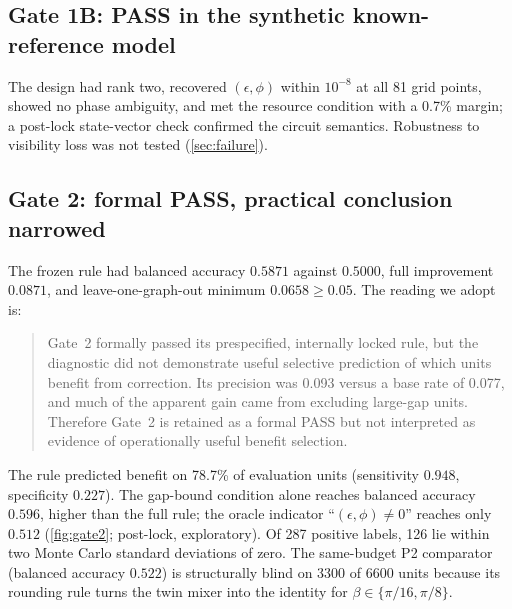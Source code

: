 \documentclass[10pt,twocolumn]{article}
\theoremstyle{definition}
\theoremstyle{remark}
\newcommand{\eps}{\epsilon}
\begin{document}
\subsection{Gate 1B: PASS in the synthetic known-reference model}
The design had rank two, recovered $(\eps,\phi)$ within $10^{-8}$ at all 81 grid points, showed no phase ambiguity, and met the resource condition with a 0.7\% margin; a post-lock state-vector check confirmed the circuit semantics. Robustness to visibility loss was not tested (\cref{sec:failure}).

\subsection{Gate 2: formal PASS, practical conclusion narrowed}
The frozen rule had balanced accuracy $0.5871$ against $0.5000$, full improvement $0.0871$, and leave-one-graph-out minimum $0.0658\ge0.05$. The reading we adopt is:
\begin{quote}\small
Gate~2 formally passed its prespecified, internally locked rule, but the diagnostic did not demonstrate useful selective prediction of which units benefit from correction. Its precision was 0.093 versus a base rate of 0.077, and much of the apparent gain came from excluding large-gap units. Therefore Gate~2 is retained as a formal PASS but not interpreted as evidence of operationally useful benefit selection.
\end{quote}
The rule predicted benefit on 78.7\% of evaluation units (sensitivity $0.948$, specificity $0.227$). The gap-bound condition alone reaches balanced accuracy $0.596$, higher than the full rule; the oracle indicator ``$(\eps,\phi)\neq0$'' reaches only $0.512$ (\cref{fig:gate2}; post-lock, exploratory). Of 287 positive labels, 126 lie within two Monte Carlo standard deviations of zero. The same-budget P2 comparator (balanced accuracy $0.522$) is structurally blind on 3300 of 6600 units because its rounding rule turns the twin mixer into the identity for $\beta\in\{\pi/16,\pi/8\}$.
\end{document}
